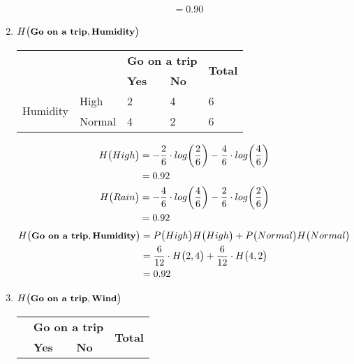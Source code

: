 \documentclass[11pt]{article}
\begin{document}
\begin{enumerate}
\begin{align*}
&= 0.90
\end{align*}
		\item $H \big(\small \textbf{Go on a trip},\textbf{Humidity}\big)$  
\begin{table}[!ht]
	\centering
	\begin{tabular}{|l|l|l|l|l|}
		\hline
		\multicolumn{2}{|l|}{\multirow{2}{*}{\textbf{}}} & \multicolumn{2}{l|}{\textbf{Go on a trip}} & \multirow{2}{*}{\textbf{Total}} \\ \cline{3-4}
		\multicolumn{2}{|l|}{}                           & \textbf{Yes}         & \textbf{No}         &                                 \\ \hline
		\multirow{2}{*}{Humidity}        & High          & 2                    & 4                   & 6                               \\ \cline{2-5} 
		& Normal        & 4                    & 2                   & 6                               \\ \hline
	\end{tabular}
\end{table}	
\begin{align*}
H \big(\small High\big) &= - \frac{2}{6} \cdot log \bigg(\frac{2}{6} \bigg) - \frac{4}{6} \cdot log \bigg(\frac{4}{6} \bigg) \\
&= 0.92 \\ 
H \big(\small Rain\big) &= - \frac{4}{6} \cdot log \bigg(\frac{4}{6} \bigg) - \frac{2}{6} \cdot log \bigg(\frac{2}{6} \bigg) \\
&= 0.92 
\end{align*}
\begin{align*}
H \big(\small \textbf{Go on a trip},\textbf{Humidity}\big) &=  P \big( High \big) H \big(\small High \big) + P \big(Normal \big) H \big(\small Normal \big)  \\
&= \frac{6}{12} \cdot H \big(2, 4\big) + \frac{6}{12} \cdot H \big(4, 2\big)\\
&= 0.92
\end{align*}
		\item $H \big(\small \textbf{Go on a trip},\textbf{Wind}\big)$  
\begin{table}[!ht]
	\centering
	\begin{tabular}{|l|l|l|l|l|}
		\hline
		\multicolumn{2}{|l|}{\multirow{2}{*}{\textbf{}}} & \multicolumn{2}{l|}{\textbf{Go on a trip}} & \multirow{2}{*}{\textbf{Total}} \\ \cline{3-4}
		\multicolumn{2}{|l|}{}                           & \textbf{Yes}         & \textbf{No}         &                                 \\ \hline

\end{tabular}
\end{table}
\end{enumerate}
\end{document}
